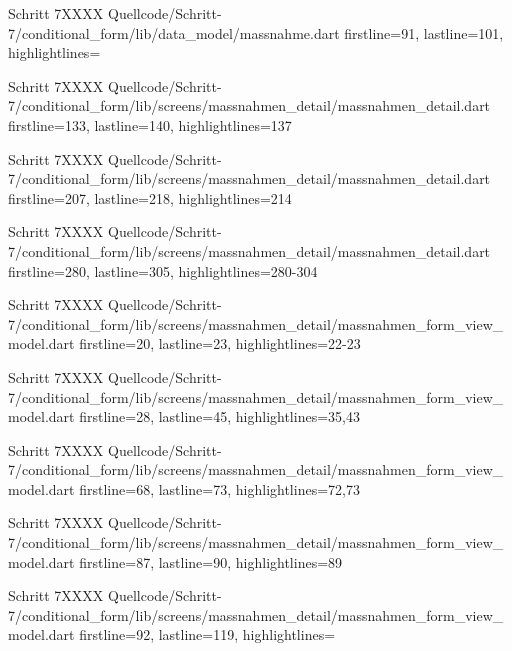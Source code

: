   \begin{alexlisting}{Schritt 7}{XXXX}
    {Quellcode/Schritt-7/conditional_form/lib/data_model/massnahme.dart}
    {firstline=91, lastline=101, highlightlines={}}
    \label{lst:Schritt5XXXX}
  \end{alexlisting}

  \begin{alexlisting}{Schritt 7}{XXXX}
    {Quellcode/Schritt-7/conditional_form/lib/screens/massnahmen_detail/massnahmen_detail.dart}
    {firstline=133, lastline=140, highlightlines={137}}
    \label{lst:Schritt6XXXXX}
  \end{alexlisting}

  \begin{alexlisting}{Schritt 7}{XXXX}
    {Quellcode/Schritt-7/conditional_form/lib/screens/massnahmen_detail/massnahmen_detail.dart}
    {firstline=207, lastline=218, highlightlines={214}}
    \label{lst:Schritt6XXXXX}
  \end{alexlisting}

  \begin{alexlisting}{Schritt 7}{XXXX}
    {Quellcode/Schritt-7/conditional_form/lib/screens/massnahmen_detail/massnahmen_detail.dart}
    {firstline=280, lastline=305, highlightlines={280-304}}
    \label{lst:Schritt6XXXXX}
  \end{alexlisting}



  \begin{alexlisting}{Schritt 7}{XXXX}
    {Quellcode/Schritt-7/conditional_form/lib/screens/massnahmen_detail/massnahmen_form_view_model.dart}
    {firstline=20, lastline=23, highlightlines={22-23}}
    \label{lst:Schritt5XXXXX}
  \end{alexlisting}
  \begin{alexlisting}{Schritt 7}{XXXX}
    {Quellcode/Schritt-7/conditional_form/lib/screens/massnahmen_detail/massnahmen_form_view_model.dart}
    {firstline=28, lastline=45, highlightlines={35,43}}
    \label{lst:Schritt5XXXXX}
  \end{alexlisting}
  \begin{alexlisting}{Schritt 7}{XXXX}
    {Quellcode/Schritt-7/conditional_form/lib/screens/massnahmen_detail/massnahmen_form_view_model.dart}
    {firstline=68, lastline=73, highlightlines={72,73}}
    \label{lst:Schritt5XXXXX}
  \end{alexlisting}
  \begin{alexlisting}{Schritt 7}{XXXX}
    {Quellcode/Schritt-7/conditional_form/lib/screens/massnahmen_detail/massnahmen_form_view_model.dart}
    {firstline=87, lastline=90, highlightlines={89}}
    \label{lst:Schritt5XXXXX}
  \end{alexlisting}
  \begin{alexlisting}{Schritt 7}{XXXX}
    {Quellcode/Schritt-7/conditional_form/lib/screens/massnahmen_detail/massnahmen_form_view_model.dart}
    {firstline=92, lastline=119, highlightlines={}}
    \label{lst:Schritt5XXXXX}
  \end{alexlisting}

